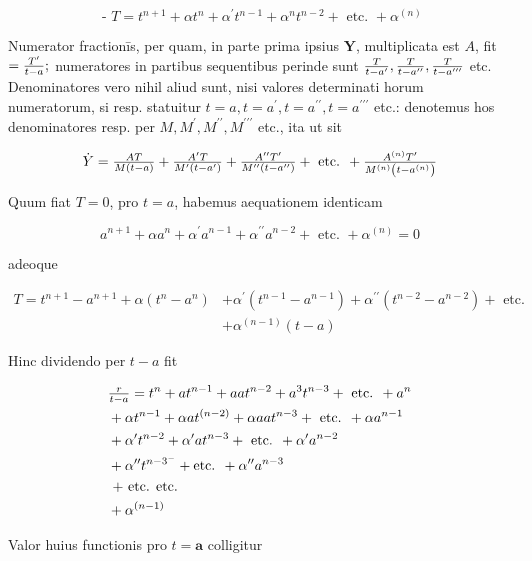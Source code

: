 \documentclass[twoside,12pt, showframe]{memoir}
\let\oldfrac\frac
\def\frac#1#2{\mathchoice{\tfrac{#1}{#2}}{\oldfrac{#1}{#2}}{\genfrac{}{}{}{2}{#1}{#2\mathstrut}}{\genfrac{}{}{}{3}{#1}{#2\mathstrut}}}
\begin{document}
\[
\text { - } T=t^{n+1}+\alpha t^{n}+\alpha^{\prime} t^{n-1}+\alpha^{n} t^{n-2}+\text { etc. }+\alpha^{(n)}
\]

Numerator fractionīs, per quam, in parte prima ipsius \(\boldsymbol{Y}\), multiplicata est \(A\), fit \(=\frac{T^{\prime}}{t-a} ;\) numeratores in partibus sequentibus perinde sunt \(\frac{T}{t-a^{\prime}}, \frac{T}{t-a^{\prime \prime}}, \frac{T}{t-a^{\prime \prime \prime}}\) etc. Denominatores vero nihil aliud sunt, nisi valores determinati horum numeratorum, si resp. statuitur \(t=a, t=a^{\prime}, t=a^{\prime \prime}, t=a^{\prime \prime \prime}\) etc.: denotemus hos denominatores resp. per \(M, M^{\prime}, M^{\prime \prime}, M^{\prime \prime \prime}\) etc., ita ut sit

\[
\dot{Y}=\frac{A T}{M(t-a)}+\frac{A^{\prime} T}{M^{\prime}\left(t-a^{\prime}\right)}+\frac{A^{\prime \prime} T^{\prime}}{M^{\prime \prime}\left(t-a^{\prime \prime}\right)}+\text { etc. }+\frac{A^{(n)} T^{\prime}}{M^{(n)}\left(t-a^{(n)}\right)}
\]

Quum fiat \(T=0\), pro \(t=a\), habemus aequationem identicam

\[
a^{n+1}+\alpha a^{n}+\alpha^{\prime} a^{n-1}+\alpha^{\prime \prime} a^{n-2}+\text { etc. }+\alpha^{(n)}=0
\]

adeoque

\[
\begin{aligned}
T=t^{n+1}-a^{n+1}+\alpha\left(t^{n}-a^{n}\right) & +\alpha^{\prime}\left(t^{n-1}-a^{n-1}\right)+\alpha^{\prime \prime}\left(t^{n-2}-a^{n-2}\right)+\text { etc. } \\
& +\alpha^{(n-1)}(t-a)
\end{aligned}
\]

Hinc dividendo per \(t-a\) fit

\[
\begin{aligned}
& \frac{r}{t-a}=t^{n}+a t^{n-1}+a a t^{n-2}+a^{3} t^{n-3}+\text { etc. }+a^{n} \\
& +\alpha t^{n-1}+\alpha a t^{(n-2)}+\alpha a a t^{n-3}+\text { etc. }+\alpha a^{n-1} \\
& +\alpha^{\prime} t^{n-2}+\alpha^{\prime} a t^{n-3}+\text { etc. }+\alpha^{\prime} a^{n-2} \\
& +\alpha^{\prime \prime} t^{n-3^{-}}+\text {etc. }+\alpha^{\prime \prime} a^{n-3} \\
& \text { + etc. etc. } \\
& +\alpha^{(n-1)}
\end{aligned}
\]

Valor huius functionis pro \(t=\boldsymbol{a}\) colligitur
\end{document}
